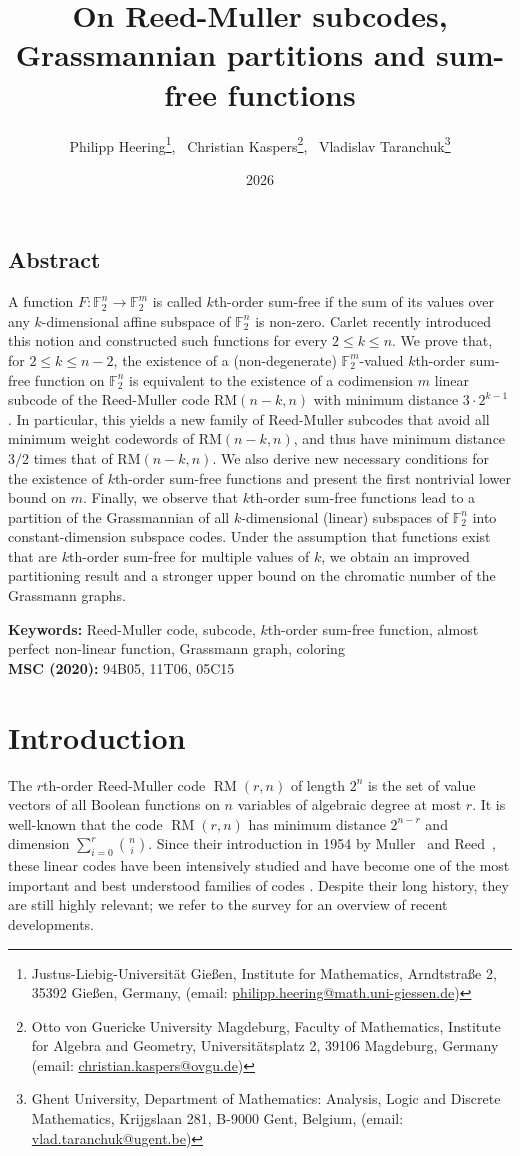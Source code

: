 \documentclass[12pt]{article}
\title{On Reed-Muller subcodes, Grassmannian partitions and sum-free functions}
\author{Philipp Heering\footnote{Justus-Liebig-Universität Gießen, Institute for Mathematics, Arndtstraße 2,
 35392 Gießen, Germany,
 (email: \href{mailto:philipp.heering@math.uni-giessen.de}{philipp.heering@math.uni-giessen.de})}, \ 
 Christian Kaspers\footnote{
Otto von Guericke University Magdeburg, Faculty of Mathematics, Institute for Algebra and Geometry, Universitätsplatz 2, 39106 Magdeburg,
Germany (email: \href{mailto:christian.kaspers@ovgu.de}{christian.kaspers@ovgu.de})}, \
Vladislav Taranchuk\footnote{Ghent University,
Department of Mathematics: Analysis, Logic and Discrete Mathematics, Krijgslaan 281,
B-9000 Gent, Belgium,
(email:  \href{mailto:vlad.taranchuk@ugent.be}{vlad.taranchuk@ugent.be})
}}
\date{2026}
\theoremstyle{definition}
\newcommand{\F}{\mathbb F}
\DeclareMathOperator{\RM}{RM}
\newcounter{numb}
\begin{document}
\maketitle

\begin{center}
\subsection*{Abstract}
\end{center}
A function $F:\F_{2}^{n}\to \F_{2}^{m}$ is called $k$th-order sum-free if the sum of its values over any $k$-dimensional affine subspace of $\F_2^n$ is non-zero. Carlet recently introduced this notion and constructed such functions for every $2\le k\le n$. We prove that, for $2\le k\le n-2$, the existence of a (non-degenerate) $\F_{2}^{m}$-valued $k$th-order sum-free function on $\F_{2}^{n}$ is equivalent to the existence of a codimension $m$ linear subcode of the Reed-Muller code $\mathrm{RM}(n-k,n)$ with minimum distance $3\cdot 2^{k-1}$. In particular, this yields a new family of Reed-Muller subcodes that avoid all minimum weight codewords of $\mathrm{RM}(n-k,n)$, and thus have minimum distance $3/2$ times that of $\mathrm{RM}(n-k,n)$. 
We also derive new necessary conditions for the existence of $k$th-order sum-free functions and present the first nontrivial lower bound on $m$. Finally, we observe that $k$th-order sum-free functions lead to a partition of the Grassmannian of all $k$-dimensional (linear) subspaces of $\F_2^n$ into constant-dimension subspace codes. Under the assumption that functions exist that are $k$th-order sum-free for multiple values of $k$, we obtain an improved partitioning result and a stronger upper bound on the chromatic number of the Grassmann graphs.

\noindent
 \textbf{Keywords:} Reed-Muller code, subcode, $k$th-order sum-free function, almost perfect non-linear function, Grassmann graph, coloring \\
 \textbf{MSC (2020):} 
94B05, %
11T06, %
05C15%

\section{Introduction}
\label{sec:introduction}
The $r$th-order Reed-Muller code $\RM(r,n)$ of length $2^n$ is the set of value vectors of all Boolean functions on $n$ variables of algebraic degree at most $r$. It is well-known that the code $\RM(r,n)$ has minimum distance $2^{n-r}$ and dimension $\sum_{i = 0}^{r}\binom{n}{i}$. Since their introduction in 1954 by Muller~\cite{muller1954} and Reed~\cite{reed1954}, these linear codes have been intensively studied and have become one of the most important and best understood families of codes \cite{MacWilliams1977TheTO}. Despite their long history, they are still highly relevant; we refer to the survey \cite{abbe2021} for an overview of recent developments. 
\end{document}
